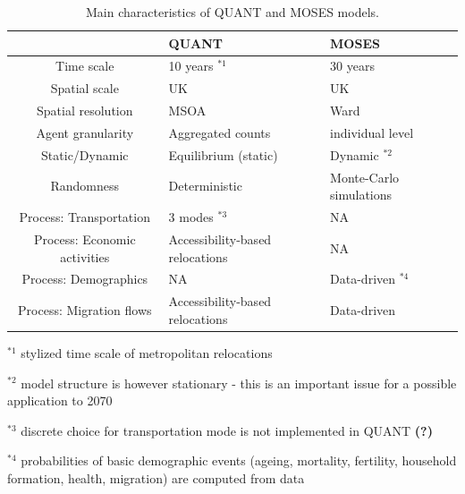 \begin{table}
\begin{threeparttable}
	\caption{Main characteristics of QUANT and MOSES models.}\label{tab:comparison}
	\centering
	\begin{tabular}{|c|p{6cm}|p{6cm}|}
	\toprule
	& QUANT & MOSES \\
	\midrule
Time scale & 10 years $^{\ast 1}$ & 30 years \\
Spatial scale & UK & UK \\
Spatial resolution & MSOA & Ward \\
Agent granularity & Aggregated counts & individual level \\
Static/Dynamic & Equilibrium (static) & Dynamic $^{\ast 2}$ \\
Randomness & Deterministic & Monte-Carlo simulations \\
Process: Transportation & 3 modes $^{\ast 3}$ & NA \\
Process: Economic activities & Accessibility-based relocations & NA \\
Process: Demographics & NA & Data-driven $^{\ast 4}$ \\
Process: Migration flows & Accessibility-based relocations & Data-driven \\
\bottomrule
	\end{tabular}
	\begin{tablenotes}
      \small
      \item $^{\ast 1}$ stylized time scale of metropolitan relocations \cite{wegener2004land}
      \item $^{\ast 2}$ model structure is however stationary - this is an important issue for a possible application to 2070
      \item $^{\ast 3}$ discrete choice for transportation mode is not implemented in QUANT \textbf{(?)} 
      \item $^{\ast 4}$ probabilities of basic demographic events (ageing, mortality, fertility, household formation, health, migration) are computed from data
    \end{tablenotes}
	\end{threeparttable}
\end{table}



